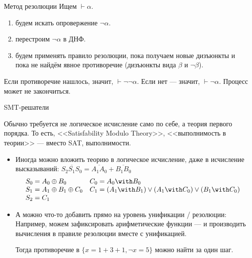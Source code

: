 \documentclass[handout]{beamer}
\begin{document}
\begin{frame}{Метод резолюции}
Ищем $\vdash\alpha$.

\begin{enumerate}
\item будем искать опровержение $\neg\alpha$.
\item перестроим $\neg\alpha$ в ДНФ.
\item будем применять правило резолюции, пока получаем новые дизъюнкты и пока 
не найдём явное противоречие (дизъюнкты вида $\beta$ и $\neg\beta$).
\end{enumerate}

Если противоречие нашлось, значит, $\vdash\neg\neg\alpha$. Если нет --- значит, $\vdash\neg\alpha$.
Процесс может не закончиться.
\end{frame}

\begin{frame}{SMT-решатели}

Обычно требуется не логическое исчисление само по себе, а теория первого порядка.
То есть, <<Satisfability Modulo Theory>>, <<выполнимость в теории>> --- вместо SAT, выполнимости.
\begin{itemize}
\item Иногда можно вложить теорию в логическое исчисление, 
даже в исчисление высказываний: $\overline{S_2S_1S_0} = \overline{A_1A_0}+\overline{B_1B_0}$
$$\begin{array}{ll}
S_0 = A_0 \oplus B_0 & C_0 = A_0 \with B_0\\
S_1 = A_1 \oplus B_1 \oplus C_0 & C_1 = (A_1 \with B_1) \vee (A_1 \with C_0) \vee (B_1 \with C_0) \\
S_2 = C_1\end{array}$$

\item А можно что-то добавить прямо на уровень унификации / резолюции:
Например, можем зафиксировать арифметические функции --- и производить вычисления
в правиле резолюции вместе с унификацией.

Тогда противоречие в $\{x = 1+3+1,\neg x = 5\}$ можно найти за один шаг.
\end{itemize}
\end{frame}
\end{document}
